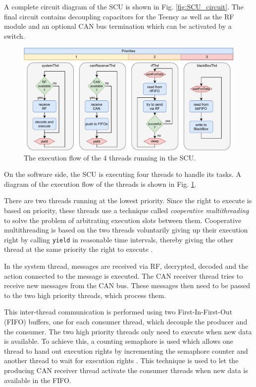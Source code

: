 \documentclass[a4paper,conference]{IEEEtran}
\begin{document}
A complete circuit diagram of the SCU is shown in Fig. \ref{fig:SCU_circuit}. The final circuit contains decoupling capacitors for the Teensy as well as the RF module and an optional CAN bus termination which can be activated by a switch.

\begin{figure}
    \centering
    \includegraphics[width=\linewidth]{documentation/images/SCU_threads.pdf}
    \caption{The execution flow of the 4 threads running in the SCU.}
    \label{fig:SCU_threads}
\end{figure}

On the software side, the SCU is executing four threads to handle its tasks. A diagram of the execution flow of the threads is shown in Fig. \ref{fig:SCU_threads}. 

There are two threads running at the lowest priority. Since the right to execute is based on priority, these threads use a technique called \textit{cooperative multithreading} to solve the problem of arbitrating execution slots between them. Cooperative multithreading is based on the two threads voluntarily giving up their execution right by calling \texttt{yield} in reasonable time intervals, thereby giving the other thread at the same priority the right to execute \cite{chibiOsYield}.

In the system thread, messages are received via RF, decrypted, decoded and the action connected to the message is executed. The CAN receiver thread tries to receive new messages from the CAN bus. These messages then need to be passed to the two high priority threads, which process them.

This inter-thread communication is performed using two First-In-First-Out (FIFO) buffers, one for each consumer thread, which decouple the producer and the consumer. The two high priority threads only need to execute when new data is available. To achieve this, a counting semaphore is used which allows one thread to hand out execution rights by incrementing the semaphore counter and another thread to wait for execution rights \cite{chibiOsSemaphore}. This technique is used to let the producing CAN receiver thread activate the consumer threads when new data is available in the FIFO.
\end{document}
